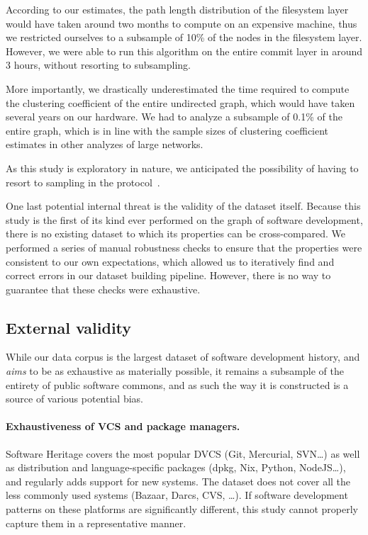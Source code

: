 According to our estimates, the path length distribution of the filesystem
layer would have taken around two months to compute on an expensive machine,
thus we restricted ourselves to a subsample of 10\% of the nodes in the
filesystem layer. However, we were able to run this algorithm on the entire
commit layer in around 3 hours, without resorting to subsampling.

More importantly, we drastically underestimated the time required to compute
the clustering coefficient of the entire undirected graph, which would have
taken several years on our hardware. We had to analyze a subsample of
0.1\% of the entire graph, which is in line with the sample sizes of
clustering coefficient estimates in other analyzes of large
networks.

As this study is exploratory in nature, we anticipated the possibility of
having to resort to sampling in the
protocol~\cite[Section 7]{msr-2020-topology}.

One last potential internal threat is the validity of the dataset itself.
Because this study is the first of its kind ever performed on the graph of
software development, there is no existing dataset to which its properties can
be cross-compared. We performed a series of manual robustness checks to ensure
that the properties were consistent to our own expectations, which allowed us
to iteratively find and correct errors in our dataset building pipeline.
However, there is no way to guarantee that these checks were exhaustive.

\subsection{External validity}

While our data corpus is the largest dataset of software development history,
and \emph{aims} to be as exhaustive as materially possible, it remains a
subsample of the entirety of public software commons, and as such the way it is
constructed is a source of various potential bias.

\paragraph{Exhaustiveness of VCS and package managers.}
Software Heritage covers the most popular DVCS (Git, Mercurial, SVN…) as well
as distribution and language-specific packages (dpkg, Nix, Python, NodeJS…),
and regularly adds support for new systems. The dataset does not cover all the
less commonly used systems (Bazaar, Darcs, CVS, …). If software development
patterns on these platforms are significantly different, this study cannot
properly capture them in a representative manner.

